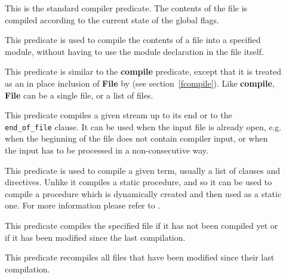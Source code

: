 \begin{description}
\item[] 
This is the standard compiler predicate.
The contents of the file is compiled according to the current
state of the global flags.

\item[] 
This predicate is used to compile the contents of a file into
a specified module, without having to use the module declaration
in the file itself.

\item[] 
This predicate is similar to the {\bf compile} predicate, except that it is
treated as an in place inclusion of {\bf File} by  (see 
section~\ref{fcompile}). Like {\bf compile}, {\bf File} can be a single
file, or a list of files.

\item[] 
This predicate compiles a given stream up to its end
or to the {\tt end_of_file} clause.
It can be used when the input file is already open,
e.g. when the beginning of the file does not contain
compiler input, or when the input has to be processed
in a non-consecutive way.

\item[] 
This predicate is used to compile a given term,
usually a list of clauses and directives.
Unlike  it compiles a static procedure,
and so it can be used to compile a procedure which is dynamically
created and then used as a static one.
For more information please refer to \cite{sepcustom}.

\item[] 
This predicate compiles the specified file if it has not been compiled
yet or if it has been modified since the last compilation.

\item[] 
This predicate recompiles all files that have been modified since their
last compilation.


\end{description}
